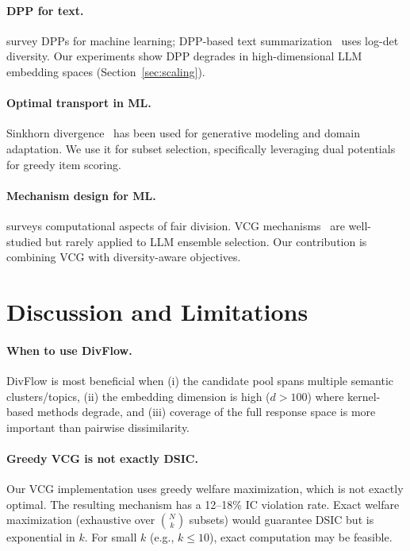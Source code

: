 \documentclass[10pt]{article}
\begin{document}
\paragraph{DPP for text.}
\citet{kulesza2012determinantal} survey DPPs for machine learning; DPP-based text summarization~\citep{cho2019multi} uses log-det diversity.
Our experiments show DPP degrades in high-dimensional LLM embedding spaces (Section~\ref{sec:scaling}).

\paragraph{Optimal transport in ML.}
Sinkhorn divergence~\citep{cuturi2013sinkhorn, feydy2019interpolating} has been used for generative modeling and domain adaptation.
We use it for subset selection, specifically leveraging dual potentials for greedy item scoring.

\paragraph{Mechanism design for ML.}
\citet{procaccia2013cake} surveys computational aspects of fair division.
VCG mechanisms~\citep{vickrey1961counterspeculation, groves1973incentives} are well-studied but rarely applied to LLM ensemble selection.
Our contribution is combining VCG with diversity-aware objectives.

\section{Discussion and Limitations}
\label{sec:discussion}

\paragraph{When to use DivFlow.}
DivFlow is most beneficial when (i) the candidate pool spans multiple semantic clusters/topics, (ii) the embedding dimension is high ($d > 100$) where kernel-based methods degrade, and (iii) coverage of the full response space is more important than pairwise dissimilarity.

\paragraph{Greedy VCG is not exactly DSIC.}
Our VCG implementation uses greedy welfare maximization, which is not exactly optimal.
The resulting mechanism has a 12--18\% IC violation rate.
Exact welfare maximization (exhaustive over $\binom{N}{k}$ subsets) would guarantee DSIC but is exponential in $k$.
For small $k$ (e.g., $k \leq 10$), exact computation may be feasible.
\end{document}
